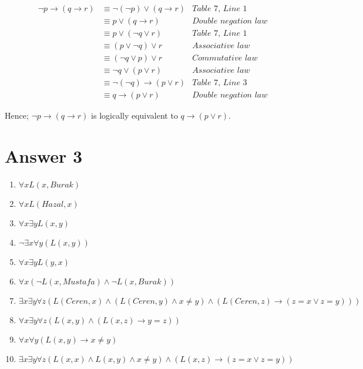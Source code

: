 \documentclass[12pt]{article}
\begin{document}
\begin{align*}
		\neg p \rightarrow (q \rightarrow r)  &\equiv \neg(\neg p) \lor (q \rightarrow r) & \textit{Table 7, Line 1}\\
		&\equiv p \lor (q \rightarrow r) & \textit{Double negation law}\\
		&\equiv p \lor (\neg q \lor r) & \textit{Table 7, Line 1}\\
		&\equiv (p \lor \neg q) \lor r & \textit{Associative law}\\
		&\equiv (\neg q \lor p ) \lor r & \textit{Commutative law}\\
		&\equiv \neg q \lor( p \lor r) & \textit{Associative law}\\
		&\equiv \neg(\neg q) \rightarrow( p \lor r) & \textit{Table 7, Line 3}\\
		&\equiv q \rightarrow( p \lor r) & \textit{Double negation law}
\end{align*}

\vspace{0.5cm}
Hence; $\neg p \rightarrow (q \rightarrow r)$ is logically equivalent to $q \rightarrow( p \lor r)$.


\section*{Answer 3}
\begin{enumerate}[label=\textbf{\alph*)}]
	\item $\forall x L(x,Burak)$

	\item $\forall x L(Hazal, x)$

	\item $\forall x\exists y L(x,y)$

	\item $\neg\exists x\forall y(L(x,y))$

	\item $\forall x\exists yL(y,x)$

	\item $\forall x(\lnot L(x,Mustafa)\land\lnot L(x,Burak))$

	\item $\exists x\exists y\forall z(L(Ceren, x) \land (L(Ceren,y)
		\land x\neq y) \land (L(Ceren,z) \rightarrow (z = x \lor z = y)))$

	\item $\forall x\exists y\forall z(L(x,y) \land (L(x,z) \rightarrow y = z))$

	\item $\forall x\forall y(L(x,y) \rightarrow x \neq y)$

	\item $\exists x\exists y\forall z(L(x,x) \land L(x,y) \land x \neq y)
		\land (L(x,z) \rightarrow (z = x \lor z = y))$

\end{enumerate}
\end{document}
